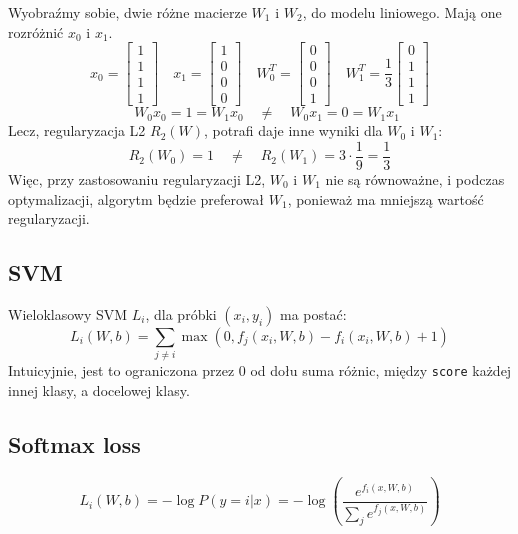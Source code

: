 \documentclass{../notatki}
\begin{document}
\begin{examplebox}
  Wyobraźmy sobie, dwie różne macierze $W_1$ i $W_2$, do modelu liniowego.
  Mają one rozróżnić $x_0$ i $x_1$.
  $$
  x_0 =
  \begin{bmatrix}
    1 \\
    1 \\
    1 \\
    1
  \end{bmatrix} \quad x_1 =
  \begin{bmatrix}
    1 \\
    0 \\
    0 \\
    0
  \end{bmatrix}
  \quad
  W_0^T =
  \begin{bmatrix}
    0 \\
    0 \\
    0 \\
    1
  \end{bmatrix} \quad W_1^T =
  \frac{1}{3}
  \begin{bmatrix}
    0 \\
    1 \\
    1 \\
    1
  \end{bmatrix}
  $$
  $$
  \quad W_0 x_0 = 1 = W_1 x_0\quad \neq \quad W_0 x_1 = 0 = W_1 x_1
  $$
  Lecz, regularyzacja L2 $R_2(W)$, potrafi daje inne wyniki dla $W_0$ i $W_1$:
  $$
  R_2(W_0) = 1 \quad \neq \quad R_2(W_1) = 3 \cdot \frac{1}{9} = \frac{1}{3}
  $$
  Więc, przy zastosowaniu regularyzacji L2, $W_0$ i $W_1$ nie są równoważne,
  i podczas optymalizacji, algorytm będzie preferował $W_1$, ponieważ
  ma mniejszą wartość regularyzacji.
\end{examplebox}

\subsection{SVM}

Wieloklasowy SVM $L_i$, dla próbki $(x_i, y_i)$ ma postać:
$$
L_i(W, b) = \sum_{j \neq i} \max(0, f_j(x_i, W, b) - f_i(x_i, W, b) + 1)
$$
Intuicyjnie, jest to ograniczona przez $0$ od dołu suma różnic,
między \texttt{score} każdej innej klasy, a docelowej klasy.

\subsection{Softmax loss}

$$
L_i(W, b) = -\log P(y = i | x) = -\log \left(\frac{e^{f_i(x, W,
b)}}{\sum_j e^{f_j(x, W, b)}}\right)
$$
\end{document}
